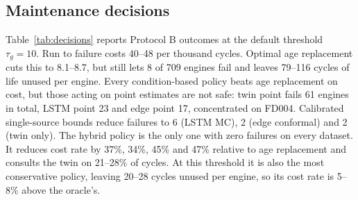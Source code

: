 \documentclass[pdflatex,sn-mathphys-num]{sn-jnl}
\begin{document}
\subsection{Maintenance decisions}
Table~\ref{tab:decisions} reports Protocol B outcomes at the default threshold $\tau_g = 10$. Run to failure costs 40--48 per thousand cycles. Optimal age replacement cuts this to 8.1--8.7, but still lets 8 of 709 engines fail and leaves 79--116 cycles of life unused per engine. Every condition-based policy beats age replacement on cost, but those acting on point estimates are not safe: twin point fails 61 engines in total, LSTM point 23 and edge point 17, concentrated on FD004. Calibrated single-source bounds reduce failures to 6 (LSTM MC), 2 (edge conformal) and 2 (twin only). The hybrid policy is the only one with zero failures on every dataset. It reduces cost rate by 37\%, 34\%, 45\% and 47\% relative to age replacement and consults the twin on 21--28\% of cycles. At this threshold it is also the most conservative policy, leaving 20--28 cycles unused per engine, so its cost rate is 5--8\% above the oracle's.
\end{document}
